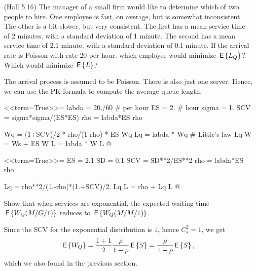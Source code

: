 \begin{question}
  (Hall 5.16) The manager of a small firm would like to determine
  which of two people to hire. One employee is fast, on average, but
  is somewhat inconsistent. The other is a bit slower, but very
  consistent. The first has a mean service time of $2$ minutes, with a
  standard deviation of 1 minute. The second has a mean service time
  of $2.1$ minute, with a standard deviation of $0.1$ minute. If the arrival rate is Poisson with rate 20 per hour, which employee would minimize $\,\mathsf{E}\left\{L_Q\right\}$? Which would minimize $\,\mathsf{E}\left\{L\right\}$? 

  \begin{solution}
    
    The arrival process is assumed to be Poisson. There is also
    just one server. Hence, we can use the PK formula to compute the average queue length.

<<term=True>>=
labda = 20./60 # per hour
ES = 2. # hour
sigma = 1.
SCV = sigma*sigma/(ES*ES)
rho = labda*ES
rho

Wq = (1+SCV)/2 * rho/(1-rho) * ES
Wq
Lq = labda * Wq # Little's law
Lq
W = Ws + ES
W
L = labda * W
L
@ 


<<term=True>>=
ES = 2.1
SD = 0.1
SCV = SD**2/ES**2
rho = labda*ES
rho

Lq = rho**2/(1.-rho)*(1.+SCV)/2.
Lq
L = rho + Lq
L
@ 

  \end{solution}

\end{question}

\begin{question}
  Show that when services are exponential, the expected waiting time
  $\,\mathsf{E}\left\{W_Q(M/G/1)\right\}$ reduces to $\,\mathsf{E}\left\{W_Q(M/M/1)\right\}$.
    \begin{solution}
      Since the SCV for the exponential distribution is $1$, hence
      $C_s^2=1$, we get 
    \begin{equation*}
\,\mathsf{E}\left\{W_Q\right\} = \frac{1+1}2\frac{\rho}{1-\rho} \,\mathsf{E}\left\{S\right\} = \frac{\rho}{1-\rho} \,\mathsf{E}\left\{S\right\},
    \end{equation*}
which we also found in the previous section.
    \end{solution}
\end{question}


